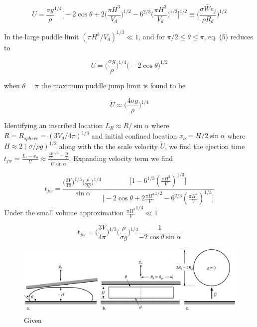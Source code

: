 \documentclass{article}
\begin{document}
\begin{equation}
{U} = \frac{\sigma g}{\rho}^{1/4} \Big[ -2\cos\theta + 2\big(\frac{\pi H^3}{V_d}\big)^{1/2} - 6^{2/3}\big(\frac{\pi H^3}{V_d}\big)^{1/3}\Big]^{1/2} \equiv \Big(\frac{\sigma \tilde{We}_j}{\rho R_d}\Big)^{1/2}
\end{equation}

In the large puddle limit $(\pi H^3 /V_d)^{1/3} \ll 1$, and for $\pi/2 \leq \theta \leq \pi$, eq. (5) reduces to

\begin{equation}
{U} = \Big(\frac{\sigma g}{\rho}\Big)^{1/4} \big(-2\cos\theta\big)^{1/2}
\end{equation}

when $\theta = \pi$ the maximum puddle jump limit is found to be 

\begin{equation}\tilde{U} \approx \Big(\frac{4\sigma g}{\rho}\Big)^{1/4}
\end{equation}

Identifying an inscribed location $L_R \approx R/\sin\alpha$ where $R
= R_{sphere} = (3V_d /4\pi)^{1/3}$ and initial confined location $x_o = H/2\sin\alpha$ where $H \approx 2(\sigma/\rho g)^{1/2}$ along with the the scale velocity $\tilde{U}$, we find the ejection time $
t_{jw} = \frac{L_r-x_o}{U} \approx \frac{\frac{3V}{4\pi}^{1/3} - \frac{H}{2}}{\tilde{U}\sin\alpha}
$. Expanding velocity term we find 


\begin{equation}
t_{jw} = \frac{\big(\frac{3V}{4\pi}\big)^{1/3}\big(\frac{\rho}{\sigma g}\big)^{1/4}}{\sin\alpha} \frac{\Big[1 - 6^{1/3}(\frac{\pi H^3}{V})^{1/3}\Big]}{\Big[-2\cos\theta + 2\frac{\pi H^3}{V}^{1/2}- 6^{2/3}(\frac{\pi H^3}{V})^{1/3}\Big]}
\end{equation} 
Under the small volume approximation $\frac{\pi H^3}{V}^{1/3} \ll 1$

\begin{equation}
t_{jw} = \Big(\frac{3V}{4\pi}\Big)^{1/3}\Big(\frac{\rho}{\sigma g}\Big)^{1/4}\frac{1}{-2\cos\theta\sin\alpha} 
\end{equation} 

\begin{figure}
	\centering
	\includegraphics[scale=0.13]{Figures/PuddleJump}
	\caption{Given}
\end{figure}
\end{document}
